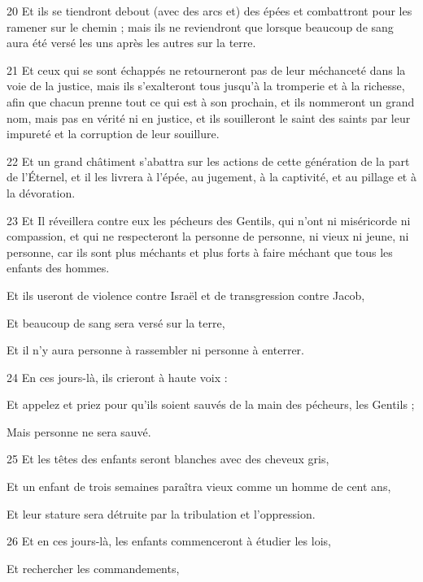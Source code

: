 \par 20 Et ils se tiendront debout (avec des arcs et) des épées et combattront pour les ramener sur le chemin ; mais ils ne reviendront que lorsque beaucoup de sang aura été versé les uns après les autres sur la terre.
\par 21 Et ceux qui se sont échappés ne retourneront pas de leur méchanceté dans la voie de la justice, mais ils s'exalteront tous jusqu'à la tromperie et à la richesse, afin que chacun prenne tout ce qui est à son prochain, et ils nommeront un grand nom, mais pas en vérité ni en justice, et ils souilleront le saint des saints par leur impureté et la corruption de leur souillure.
\par 22 Et un grand châtiment s'abattra sur les actions de cette génération de la part de l'Éternel, et il les livrera à l'épée, au jugement, à la captivité, et au pillage et à la dévoration.
\par 23 Et Il réveillera contre eux les pécheurs des Gentils, qui n'ont ni miséricorde ni compassion, et qui ne respecteront la personne de personne, ni vieux ni jeune, ni personne, car ils sont plus méchants et plus forts à faire méchant que tous les enfants des hommes.
\par    
\par     Et ils useront de violence contre Israël et de transgression contre Jacob,  
\par     Et beaucoup de sang sera versé sur la terre,  
\par     Et il n’y aura personne à rassembler ni personne à enterrer.
\par    
\par 24 En ces jours-là, ils crieront à haute voix :  
\par     Et appelez et priez pour qu'ils soient sauvés de la main des pécheurs, les Gentils ;  
\par     Mais personne ne sera sauvé.
\par    
\par 25 Et les têtes des enfants seront blanches avec des cheveux gris,  
\par     Et un enfant de trois semaines paraîtra vieux comme un homme de cent ans,  
\par     Et leur stature sera détruite par la tribulation et l'oppression.
\par    
\par 26 Et en ces jours-là, les enfants commenceront à étudier les lois,  
\par     Et rechercher les commandements,  

